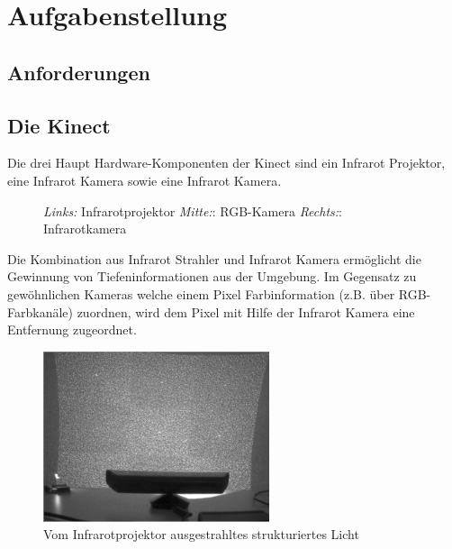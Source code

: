 \chapter{Aufgabenstellung}


\section{Anforderungen}
\section{Die Kinect}
Die drei Haupt Hardware-Komponenten der Kinect sind ein Infrarot Projektor, eine Infrarot Kamera sowie eine Infrarot Kamera.


\begin{figure}[!ht]
  \centering
   \caption{\emph {Links:} Infrarotprojektor \emph {Mitte:}: RGB-Kamera  \emph {Rechts:}: Infrarotkamera }
\end{figure}

Die Kombination aus Infrarot Strahler und Infrarot Kamera ermöglicht die Gewinnung von Tiefeninformationen aus der Umgebung. Im Gegensatz zu gewöhnlichen Kameras welche einem Pixel Farbinformation (z.B.  über RGB-Farbkanäle) zuordnen, wird dem Pixel mit Hilfe der Infrarot Kamera eine Entfernung zugeordnet.

\begin{figure}
  \vspace{-20pt}
  \begin{center}
        \includegraphics[height=5cm]{Res/Kinect_9Points.png}
  \end{center}
  \vspace{-20pt}
  \caption{Vom Infrarotprojektor ausgestrahltes strukturiertes Licht }
  \vspace{-10pt}
\end{figure}

